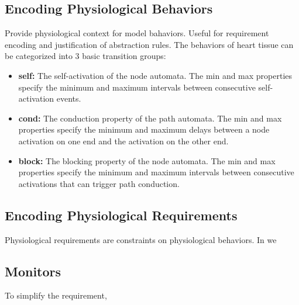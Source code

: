 \subsection{Encoding Physiological Behaviors}
Provide physiological context for model bahaviors. Useful for requirement encoding and justification of abstraction rules. The behaviors of heart tissue can be categorized into 3 basic transition groups:

\begin{itemize}
	\item \textbf{self:} The self-activation of the node automata. The min and max properties specify the minimum and maximum intervals between consecutive self-activation events.
	\item \textbf{cond:} The conduction property of the path automata. The min and max properties specify the minimum and maximum delays between a node activation on one end and the activation on the other end.
	\item \textbf{block:} The blocking property of the node automata. The min and max properties specify the minimum and maximum intervals between consecutive activations that can trigger path conduction.
\end{itemize}

\subsection{Encoding Physiological Requirements}
Physiological requirements are constraints on physiological behaviors. In \cite{iccps10} we 

\subsection{Monitors}
To simplify the requirement, \cite{iccps10}
%